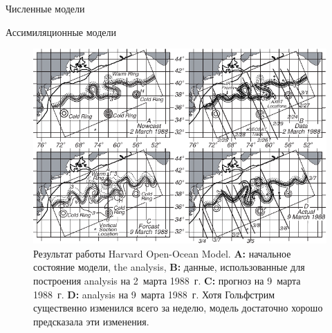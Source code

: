 \begin{chapter}{Численные модели}
\begin{section}{Ассимиляционные модели}
\begin{figure}[t!]
\includegraphics{pics/harvardmodelR}
\caption{Результат работы Harvard Open-Ocean Model.
\textbf{A:} начальное состояние модели, the analysis, 
\textbf{B:} данные, использованные для построения analysis 
на 2~марта 1988~г. 
\textbf{C:} прогноз на 9~марта 1988~г. 
\textbf{D:} analysis на 9~марта 1988~г.
Хотя Гольфстрим существенно изменился
всего за неделю, модель достаточно хорошо предсказала эти 
изменения.~\cite{Robinson:1989}}
\label{fig:harvardmodel}
\end{figure}
%


\end{section}
\end{chapter}
